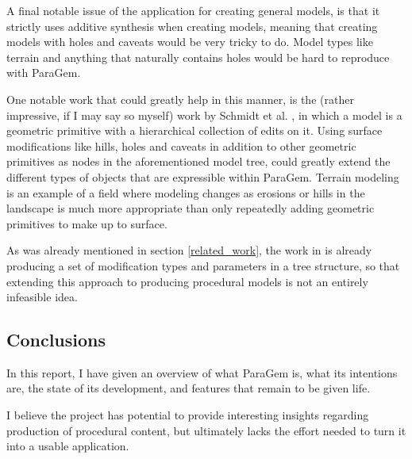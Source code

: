 \documentclass[english]{article}
\begin{document}
A final notable issue of the application for creating general models, is that it strictly uses additive synthesis when creating models, meaning that creating models with holes and caveats would be very tricky to do. Model types like terrain and anything that naturally contains holes would be hard to reproduce with ParaGem.

One notable work that could greatly help in this manner, is the (rather impressive, if I may say so myself) work by Schmidt et al. \cite{schmidt08}, in which a model is a geometric primitive with a hierarchical collection of edits on it. Using surface modifications like hills, holes and caveats in addition to other geometric primitives as nodes in the aforementioned model tree, could greatly extend the different types of objects that are expressible within ParaGem. Terrain modeling is an example of a field where modeling changes as erosions or hills in the landscape is much more appropriate than only repeatedly adding geometric primitives to make up to surface.

As was already mentioned in section \ref{related_work}, the work in \cite{schmidt08} is already producing a set of modification types and parameters in a tree structure, so that extending this approach to producing procedural models is not an entirely infeasible idea.

\subsection{Conclusions} \label{section_conclusion}


In this report, I have given an overview of what ParaGem is, what its intentions are, the state of its development, and features that remain to be given life.

I believe the project has potential to provide interesting insights regarding production of procedural content, but ultimately lacks the effort needed to turn it into a usable application.



\end{document}
